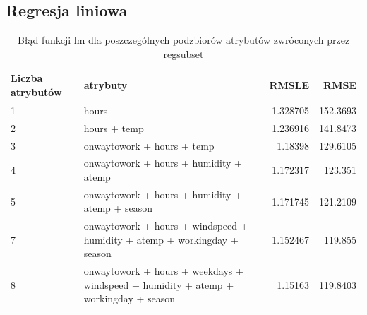 \documentclass[a4paper,12pt]{article}
\begin{document}
    \subsection{Regresja liniowa}
		\begin{table}[h]
			\begin{tabular}{|p{2cm}|p{8cm}|r|r|}
				\hline 
				Liczba atrybutów & atrybuty & RMSLE & RMSE \\ 
				\hline 
				1 &  
				hours 
				&  
				1.328705
				&  
				152.3693
				\\ 
				\hline 
				2 &  
				hours + temp
				&  
				1.236916
				&  
				141.8473
				\\ 
				\hline 
				3 &  
				onwaytowork + hours + temp
				&  
				1.18398
				&  
				129.6105
				\\ 
				\hline 
				4 &  
				onwaytowork + hours + humidity + atemp
				&  
				1.172317
				&  
				123.351
				\\ 
				\hline 
				5 &  onwaytowork + hours + humidity + atemp + season 
				&  
				1.171745
				&  
				121.2109
				\\ 
				\hline 
				7 & onwaytowork + hours + windspeed + humidity + atemp + workingday + season &  
				1.152467
				&  
				119.855
				\\ 
				\hline 
				8 &  
				onwaytowork + hours + weekdays + windspeed + humidity + atemp + workingday + season  
				&  
				1.15163
				&  
				119.8403
				\\ 
				\hline 
			\end{tabular} 
			\caption{Błąd funkcji lm dla poszczególnych podzbiorów atrybutów zwróconych przez regsubset}
		\end{table}
\end{document}
